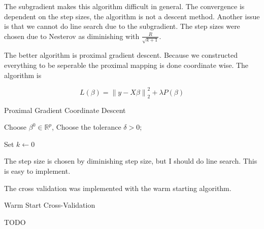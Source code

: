 \documentclass[12pt, a4paper, reqno]{article}
\numberwithin{equation}{section}
\newcommand{\norm}[1]{\left\lVert#1\right\rVert}
\newcommand{\R}{\mathbb{R}}
\begin{document}
The subgradient makes this algorithm difficult in general.
The convergence is dependent on the step sizes, the algorithm is not a descent method.
Another issue is that we cannot do line search due to the subgradient.
The step sizes were chosen due to Nesterov \cite{nesterov} as diminishing with $\frac{R}{\sqrt{k + 1}}$.

The better algorithm is proximal gradient descent.
Because we constructed everything to be seperable the proximal mapping is done coordinate wise.
The algorithm is

\[
L(\beta) = \norm{y - X \beta}_2^2 + \lambda P(\beta)
\]

\vspace{.5cm}
\begin{algorithm}[H]
\caption{Proximal Gradient Coordinate Descent}
Choose $\beta^0 \in \R^p$, Choose the tolerance $\delta > 0$;

Set $k \gets 0$

\end{algorithm}
\vspace{.5cm}

The step size is chosen by diminishing step size, but I should do line search. This is easy to implement.

The cross validation was implemented with the warm starting algorithm.

\vspace{.5cm}
\begin{algorithm}[H]
\caption{Warm Start Cross-Validation}
TODO
\end{algorithm}
\vspace{.5cm}
\end{document}
